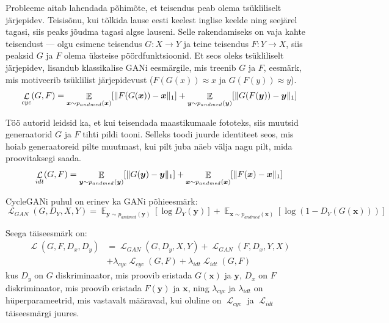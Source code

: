 \documentclass{vilgym}
\DeclareMathOperator{\EX}{\mathbb{E}}
\DeclareMathOperator{\loss}{\mathcal{L}}
\DeclarePairedDelimiter{\norm}{\lVert}{\rVert}
\begin{document}
	Probleeme aitab lahendada põhimõte, et teisendus peab olema tsükliliselt järjepidev. Teisisõnu, kui tõlkida lause eesti keelest inglise keelde ning seejärel tagasi, siis peaks jõudma tagasi algse lauseni. Selle rakendamiseks on vaja kahte teisendust --- olgu esimene teisendus $ G: X \rightarrow Y $ ja teine teisendus $F: Y \rightarrow X $, siis peaksid $ G $ ja $ F $ olema üksteise pöördfunktsioonid. Et seos oleks tsükliliselt järjepidev, lisandub klassikalise GANi eesmärgile, mis treenib $ G $ ja $ F $, eesmärk, mis motiveerib tsüklilist järjepidevust ($ F(G(x)) \approx x $ ja $ G(F(y)) \approx y $).
	\begin{equation}
		\loss_{cyc}(G,F) = \EX_{\boldsymbol{x}\sim p_{andmed}(\boldsymbol{x})}[\norm{F(G(\boldsymbol{x})) - \boldsymbol{x}}_1] + \EX_{\boldsymbol{y}\sim p_{andmed}(\boldsymbol{y})}[\norm{G(F(\boldsymbol{y})) - \boldsymbol{y}}_1]
	\end{equation}

	Töö autorid leidsid ka, et kui teisendada maastikumaale fototeks, siis muutsid generaatorid $ G $ ja $ F $ tihti pildi tooni. Selleks toodi	juurde identiteet seos, mis hoiab generaatoreid pilte muutmast, kui pilt juba näeb välja nagu pilt, mida proovitaksegi saada.
	\begin{equation}
		\loss_{idt}(G,F) = \EX_{\boldsymbol{y}\sim p_{andmed}(\boldsymbol{y})}[\norm{G(\boldsymbol{y}) - \boldsymbol{y}}_1] + \EX_{\boldsymbol{x}\sim p_{andmed}(\boldsymbol{x})}[\norm{F(\boldsymbol{x}) - \boldsymbol{x}}_1]
	\end{equation}

	CycleGANi puhul on erinev ka GANi põhieesmärk:
	\begin{equation}
		\loss_{GAN}(G,D_Y, X, Y) = \EX_{\boldsymbol{y}\sim p_{andmed}(\boldsymbol{y})}[\log D_Y(\boldsymbol{y})] + \EX_{\boldsymbol{x}\sim p_{andmed}(\boldsymbol{x})}[\log(1-D_Y(G(\boldsymbol{x})))]
	\end{equation}
	
	Seega täiseesmärk on:
	\begin{equation} \label{eq:cyclegan}
		\begin{aligned}
			\loss(G, F, D_x, D_y) &= \loss_{GAN}(G, D_y, X, Y) + \loss_{GAN}(F, D_x, Y, X) \\
								  &+ \lambda_{cyc} \loss_{cyc}(G, F) + \lambda_{idt} \loss_{idt}(G, F)
		\end{aligned}
	\end{equation}
	kus $ D_y $ on $ G $ diskriminaator, mis proovib eristada $ G(\boldsymbol{x}) $ ja $ \boldsymbol{y} $, $ D_x $ on  $ F $ diskriminaator, mis proovib eristada $ F(\boldsymbol{y}) $ ja $ \boldsymbol{x} $, ning $ \lambda_{cyc} $ ja $ \lambda_{idt} $ on hüperparameetrid, mis vastavalt määravad, kui oluline on $ \loss_{cyc} $ ja $ \loss_{idt} $ täiseesmärgi juures. \parencite{cyclegan}
\end{document}
